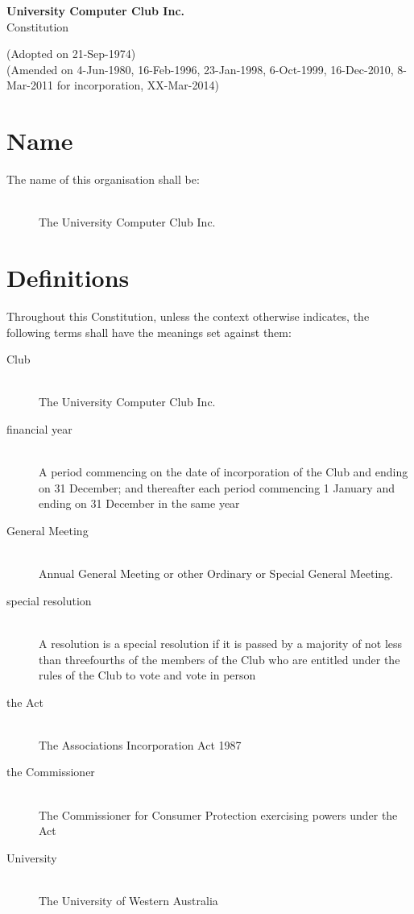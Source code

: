\documentclass[11pt]{article} %
\makeatletter
\renewcommand\tableofcontents{%
    \@starttoc{toc}%
}
\makeatother
\begin{document}
\noindent
\begin{center}
\textbf{\LARGE{University Computer Club Inc.}}\\
\Large{Constitution}
\end{center}

\noindent
\small{(Adopted on 21-Sep-1974)\\
(Amended on 4-Jun-1980, 16-Feb-1996, 23-Jan-1998, 6-Oct-1999, 16-Dec-2010, 8-Mar-2011 for incorporation, XX-Mar-2014)\\}

\begingroup
	\let\cleardoublepage\clearpage
	\def\addvspace#1{}
	\tableofcontents
\endgroup


\section{Name}
\begin{description}
	\item[The name of this organisation shall be:] \hfill \\
		The University Computer Club Inc.
\end{description}

\section{Definitions}
Throughout this Constitution, unless the context otherwise indicates, the following terms shall have the meanings set against them:
\begin{description}
	\item[Club] \hfill \\
		The University Computer Club Inc.
	\item[financial year] \hfill \\
		A period commencing on the date of incorporation of the Club and ending on 31 December; and thereafter each period commencing 1 January and ending on 31 December in the same year
	\item[General Meeting] \hfill \\
		Annual General Meeting or other Ordinary or Special General Meeting.
	\item[special resolution] \hfill \\
		A resolution is a special resolution if it is passed by a majority of not less than threefourths of the members of the Club who are entitled under the rules of the Club to vote and vote in person
	\item[the Act] \hfill \\
		The Associations Incorporation Act 1987
	\item[the Commissioner] \hfill \\
		The Commissioner for Consumer Protection exercising powers under the Act
	\item[University] \hfill \\
		The University of Western Australia
\end{description}
\end{document}
